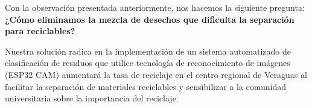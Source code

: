 Con la observación presentada anteriormente, nos hacemos la siguiente pregunta:
\textbf{¿Cómo eliminamos la mezcla de desechos que dificulta la separación para reciclables?}

Nuestra solución radica en la implementación de un sistema automatizado de clasificación de residuos que utilice tecnología de reconocimiento de imágenes (ESP32 CAM) aumentará la tasa de reciclaje en el centro regional de Veraguas al facilitar la separación de materiales reciclables y sensibilizar a la comunidad universitaria sobre la importancia del reciclaje.